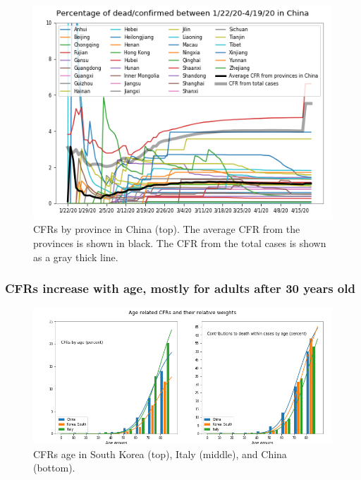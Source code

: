 \documentclass[8pt]{article}
\begin{document}
\begin{figure}[h]
    \centering
    \begin{minipage}{0.6\textwidth}
    \includegraphics[width=\textwidth]{figures/tsam_Covid19_JHU_cfr_ProvincesChina_fromFirstLocalReport}
    \end{minipage}%
    \begin{minipage}{0.4\textwidth}
    \caption{CFRs by province in China (top). The average CFR from the provinces is shown in black. The CFR from the total cases is shown as a gray thick line.}
    \label{fig:cfrsProvinces}
    \end{minipage}
\end{figure}

\subsubsection{CFRs increase with age, mostly for adults after 30 years old}

\begin{figure}[h]
    \centering
    \includegraphics[width=\textwidth]{figures/tsam_Covid19_JHU_cfr+propDeathCases_ByAge_China+SKorea+Italy_OneFigure.png}
    \caption{CFRs age in South Korea (top), Italy (middle), and China (bottom).}
    \label{fig:cfrsAge}
\end{figure}
\end{document}
